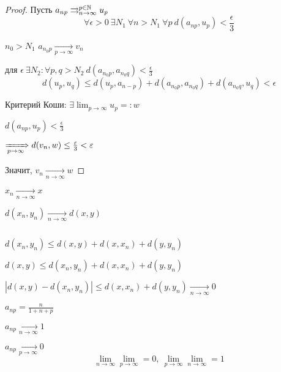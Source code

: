     \begin{proof}
        Пусть $a_{np} \rightrightarrows_{n \rightarrow \infty}^{p \in \N} u_p$ %
        \[
            \forall \epsilon > 0 \ \exists N_1 \ \forall n > N_1 \ \forall p \ d(a_{np}, u_p) < \frac{\epsilon}{3}   
        \]
        \par $n_0 > N_1$ \quad $a_{n_0p} \xrightarrow[p \rightarrow \infty]{} v_n$
        \par для $\epsilon \ \exists N_2 : \forall p, q > N_2 \ d(a_{n_0p}, a_{n_0q}) < \frac{\epsilon}{3}$
        \[
            d(u_p, u_q) \le d(u_p, a_{n-p}) + d(a_{n_0p}, a_{n_0q}) + d(a_{n_0q}, u_q) < \epsilon    
        \]
        \par Критерий Коши: $\exists \lim_{p \rightarrow \infty} u_p =: w$
        \par $d(a_{np}, u_p) < \frac{\epsilon}{3}$
        \par $\xRightarrow[p \rightarrow \infty]{} d(v_n, w) \le \frac{\epsilon}{3} < \epsilon$
        \par Значит, $v_n \xrightarrow[n \rightarrow \infty]{} w$
    \end{proof}

    \begin{remark}
        $x_n \xrightarrow[n \rightarrow \infty]{} x$
        \par $d(x_n, y_n) \xrightarrow[n \rightarrow \infty]{} d(x, y)$
        \par $ $
        \par $d(x_n, y_n) \le d(x, y) + d(x, x_n) + d(y, y_n)$
        \par $d(x, y) \le d(x_n, y_n) + d(x, x_n) + d(y, y_n)$
        \par $|d(x, y) - d(x_n, y_n)| \le d(x, x_n) + d(y, y_n) \xrightarrow[n \rightarrow \infty]{} 0$
    \end{remark}

    \begin{illustration} %
        $a_{np} = \frac{n}{1 + n + p}$
        \par $a_{np} \xrightarrow[n \rightarrow \infty]{} 1$
        \par $a_{np} \xrightarrow[p \rightarrow \infty]{} 0$
        \[
            \lim_{n \rightarrow \infty} \lim_{p \rightarrow \infty} = 0, \ \lim_{p \rightarrow \infty} \lim_{n \rightarrow \infty} = 1    
        \]
    \end{illustration}


